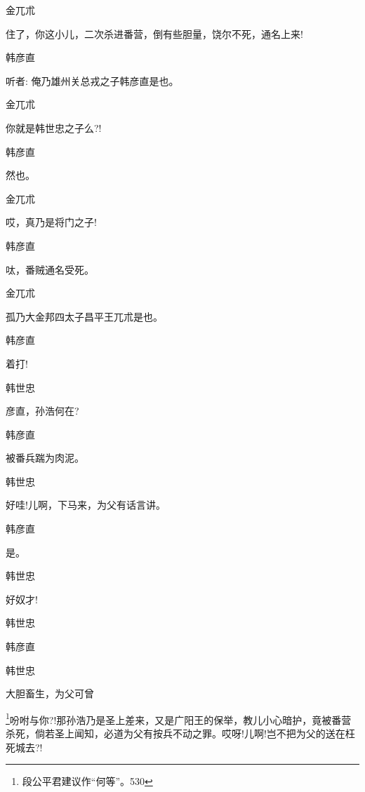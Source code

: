 {{{{金兀朮

住了，你这小儿，二次杀进番营，倒有些胆量，饶尔不死，通名上来!}

{韩彦直\hspace{20pt}~

听者: 俺乃雄州关总戎之子韩彦直是也。}

{金兀朮\hspace{20pt}~

你就是韩世忠之子么?!}

{韩彦直\hspace{20pt}~

然也。}

{金兀朮\hspace{20pt}~

哎，真乃是将门之子!}

{韩彦直\hspace{20pt}~

呔，番贼通名受死。}

{金兀朮\hspace{20pt}~

孤乃大金邦四太子昌平王兀朮是也。}

{韩彦直\hspace{20pt}~

着打!}

{韩世忠\hspace{20pt}~

彦直，孙浩何在?}

{韩彦直\hspace{20pt}~

被番兵踹为肉泥。}

{韩世忠\hspace{20pt}~

好哇!儿啊，下马来，为父有话言讲。}

{韩彦直\hspace{20pt}~

是。}

{韩世忠\hspace{20pt}~

好奴才!}

{韩世忠

 }

{韩彦直\hspace{20pt}~

 }

{韩世忠

大胆畜生，为父可曾}\footnote{ 段公平君建议作``何等''。{530}}{吩咐与你?!那孙浩乃是圣上差来，又是广阳王的保举，教儿小心暗护，竟被番营杀死，倘若圣上闻知，必道为父有按兵不动之罪。哎呀!儿啊!岂不把为父的送在枉死城去?!}

}}}
